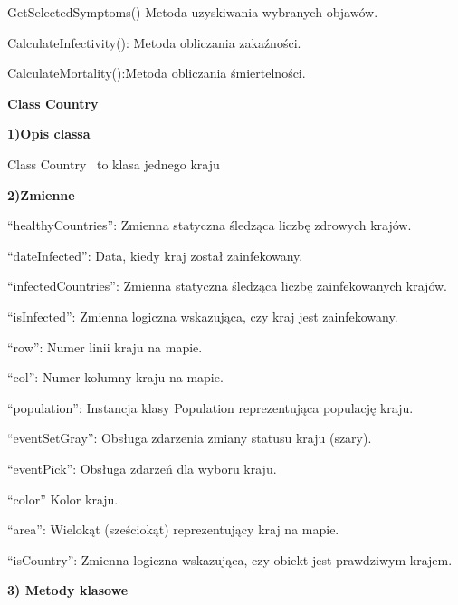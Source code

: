 \documentclass[a4paper]{article}
\begin{document}
\foreignlanguage{polish}{GetSelectedSymptoms() Metoda uzyskiwania wybranych objawów.}

\foreignlanguage{polish}{CalculateInfectivity(): Metoda obliczania zakaźności.}

\foreignlanguage{polish}{CalculateMortality():Metoda obliczania śmiertelności.}


\bigskip


\bigskip

{\centering
\foreignlanguage{english}{\textbf{Class Country}}
\par}
\vspace{6pt}
\foreignlanguage{english}{\textbf{1)Opis classa}}

\foreignlanguage{polish}{Class Country \ to klasa jednego kraju}

\bigskip

\foreignlanguage{polish}{\textbf{2)Zmienne}}

\foreignlanguage{polish}{“healthyCountries”: Zmienna statyczna śledząca liczbę zdrowych krajów.}

\foreignlanguage{polish}{“dateInfected”: Data, kiedy kraj został zainfekowany.}

\foreignlanguage{polish}{“infectedCountries”: Zmienna statyczna śledząca liczbę zainfekowanych krajów.}

\foreignlanguage{polish}{“isInfected”: Zmienna logiczna wskazująca, czy kraj jest zainfekowany.}

\foreignlanguage{polish}{“row”: Numer linii kraju na mapie.}

\foreignlanguage{polish}{“col”: Numer kolumny kraju na mapie.}

\foreignlanguage{polish}{“population”: Instancja klasy Population reprezentująca populację kraju.}

\foreignlanguage{polish}{“eventSetGray”: Obsługa zdarzenia zmiany statusu kraju (szary).}

\foreignlanguage{polish}{“eventPick”: Obsługa zdarzeń dla wyboru kraju.}

\foreignlanguage{polish}{“color” Kolor kraju.}

\foreignlanguage{polish}{“area”: Wielokąt (sześciokąt) reprezentujący kraj na mapie.}

\foreignlanguage{polish}{“isCountry”: Zmienna logiczna wskazująca, czy obiekt jest prawdziwym krajem.}


\bigskip

\foreignlanguage{english}{\textbf{3) Metody klasowe}}
\end{document}
